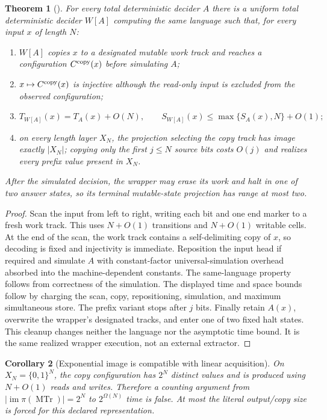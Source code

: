 \documentclass[11pt]{article}
\newtheorem{theorem}{Theorem}
\newtheorem{corollary}[theorem]{Corollary}
\newcommand{\claim}[1]{\texttt{\detokenize{#1}}}
\begin{document}
\begin{theorem}[\claim{MUTABLE-TRACE-COPY-LEAKAGE1}]
For every total deterministic decider $A$ there is a uniform total
deterministic decider $W[A]$ computing the same language such that, for every
input $x$ of length $N$:
\begin{enumerate}[label=(\roman*)]
\item $W[A]$ copies $x$ to a designated mutable work track and reaches a
configuration $C^{\rm copy}(x)$ before simulating $A$;
\item $x\mapsto C^{\rm copy}(x)$ is injective although the read-only input is
excluded from the observed configuration;
\item
\[
 T_{W[A]}(x)=T_A(x)+O(N),\qquad
 S_{W[A]}(x)\le \max\{S_A(x),N\}+O(1);
\]
\item on every length layer $X_N$, the projection selecting the copy track
has image exactly $|X_N|$; copying only the first $j\le N$ source bits costs
$O(j)$ and realizes every prefix value present in $X_N$.
\end{enumerate}
After the simulated decision, the wrapper may erase its work and halt in one
of two answer states, so its terminal mutable-state projection has range at
most two.
\end{theorem}

\begin{proof}
Scan the input from left to right, writing each bit and one end marker to a
fresh work track.  This uses $N+O(1)$ transitions and $N+O(1)$ writable cells.
At the end of the scan, the work track contains a self-delimiting copy of
$x$, so decoding is fixed and injectivity is immediate.  Reposition the input
head if required and simulate $A$ with constant-factor universal-simulation
overhead absorbed into the machine-dependent constants.  The same-language
property follows from correctness of the simulation.  The displayed time and
space bounds follow by charging the scan, copy, repositioning, simulation,
and maximum simultaneous store.  The prefix variant stops after $j$ bits.
Finally retain $A(x)$, overwrite the wrapper's designated tracks, and enter
one of two fixed halt states.  This cleanup changes neither the language nor
the asymptotic time bound.  It is the same realized wrapper execution, not an
external extractor.
\end{proof}

\begin{corollary}[Exponential image is compatible with linear acquisition]
On $X_N=\{0,1\}^N$, the copy configuration has $2^N$ distinct values and is
produced using $N+O(1)$ reads and writes.  Therefore a counting argument from
$|\operatorname{im}\pi(\operatorname{MTr})|=2^N$ to $2^{\Omega(N)}$ time is
false.  At most the literal output/copy size is forced for this declared
representation.
\end{corollary}
\end{document}
